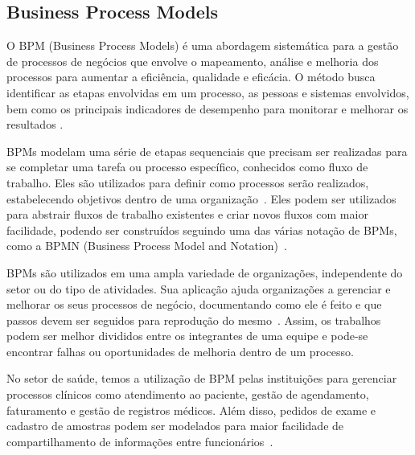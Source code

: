 \subsection{Business Process Models}


O BPM (Business Process Models) é uma abordagem sistemática para a gestão de processos de negócios que envolve o mapeamento, análise e melhoria dos processos para aumentar a eficiência, qualidade e eficácia. O método busca identificar as etapas envolvidas em um processo, as pessoas e sistemas envolvidos, bem como os principais indicadores de desempenho para monitorar e melhorar os resultados \R.


BPMs modelam uma série de etapas sequenciais que precisam ser realizadas para se completar uma tarefa ou processo específico, conhecidos como fluxo de trabalho. Eles são utilizados para definir como processos serão realizados, estabelecendo objetivos dentro de uma organização~\cite{Alves2014UnderstandingOrganizations}. Eles podem ser utilizados para abstrair fluxos de trabalho existentes e criar novos fluxos com maior facilidade, podendo ser construídos seguindo uma das várias notação de BPMs, como a BPMN (Business Process Model and Notation)~\cite{Dijkman2008SemanticsBPMN}.



BPMs são utilizados em uma ampla variedade de organizações, independente do setor ou do tipo de atividades. Sua aplicação ajuda organizações a gerenciar e melhorar os seus processos de negócio, documentando como ele é feito e que passos devem ser seguidos para reprodução do mesmo~\cite{DaSilva2014BusinessNot}. Assim, os trabalhos podem ser melhor divididos entre os integrantes de uma equipe e pode-se encontrar falhas ou oportunidades de melhoria dentro de um processo.



No setor de saúde, temos a utilização de BPM pelas instituições para gerenciar processos clínicos como atendimento ao paciente, gestão de agendamento, faturamento e gestão de registros médicos. Além disso, pedidos de exame e cadastro de amostras podem ser modelados para maior facilidade de compartilhamento de informações entre funcionários~\cite{Ruiz2012BusinessHealthcare.}.

